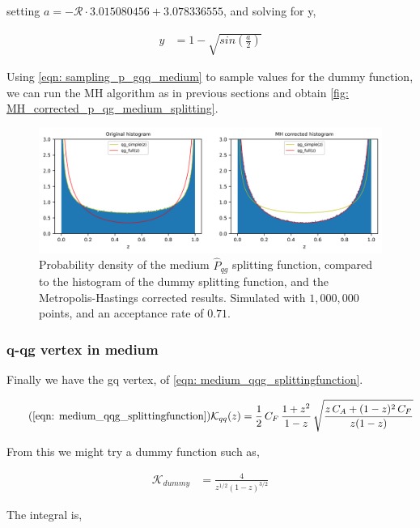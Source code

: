 \documentclass[main.tex]{subfiles}
\begin{document}
setting \(a = -\mathcal{R} \cdot 3.015080456 + 3.078336555\), and solving for y, 

\begin{align}\label{eqn: sampling_p_gqq_medium}
    y &= 1- \sqrt{sin\left(\frac{a}{2}\right)}
\end{align}

Using \autoref{eqn: sampling_p_gqq_medium} to sample values for the dummy function, we can run the MH algorithm as in previous sections and obtain \autoref{fig: MH_corrected_p_qg_medium_splitting}.

\begin{figure}[ht]
    \centering
    \includegraphics[width=14cm]{pictures/MH_plots/MH_medium_qg.png}
    \caption{Probability density of the medium \(\hat{P}_{qg}\) splitting function, compared to the histogram of the dummy splitting function, and the Metropolis-Hastings corrected results. Simulated with \(1,000,000\) points, and an acceptance rate of \(0.71\).}
    \label{fig: MH_corrected_p_qg_medium_splitting}
\end{figure}


\subsubsection{q-qg vertex in medium}
Finally we have the gq vertex, of \autoref{eqn: medium_qqg_splittingfunction}. 

\begin{equation}\tag{\ref{eqn: medium_qqg_splittingfunction}}
     \mathcal{K}_{qq}(z) = \frac{1}{2} \, C_F \, \frac{1+z^2}{1-z} \, \sqrt{\frac{z\, C_A + (1-z)^2 \, C_F}{z(1-z)}}
\end{equation}

From this we might try a dummy function such as, 

\begin{align}
    \mathcal{K}_{dummy} &= \frac{4}{z^{1/2} (1-z)^{3/2}}
\end{align}

The integral is, 
\end{document}
